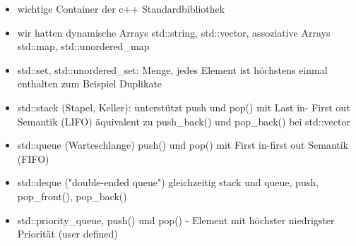 \documentclass[a4paper]{scrartcl}
\theoremstyle{definition}
\theoremstyle{plain}
\theoremstyle{remark}
\theoremstyle{remark}
\begin{document}
\begin{itemize}
\item wichtige Container der c++ Standardbibliothek
\item wir hatten dynamische Arrays std::string, std::vector, assoziative Arrays std::map, std::unordered\_map
\item std::set, std::unordered\_set: Menge, jedes Element ist höchstens einmal enthalten zum Beispiel Duplikate
\item std::stack (Stapel, Keller): unterstützt push und pop() mit Last in- First out Semantik (LIFO) äquivalent zu push\_back() und pop\_back() bei std::vector
\item std::queue (Warteschlange) push() und pop() mit First in-first out Semantik (FIFO)
\item std::deque ("double-ended queue") gleichzeitig stack und queue, push, pop\_front(), pop\_back()
\item std::priority\_queue, push() und pop() - Element mit höchster niedrigster Priorität (user defined)
\end{itemize}
\end{document}
